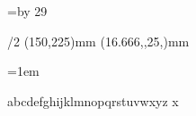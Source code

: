 

\fontfam[dante]



\currvar



\typosize[12/14.29]

\def\titlcap#1{%
	{\setff{+titl}\currvar #1}%
}


\svlang


\hsize=100mm
\vsize=\topskip \advance \vsize by 29\baselineskip

\margins/2 (150,225)mm (16.666,,25,)mm

\baselineskip


\def\myred{\setcmykcolor{0 1 1 0.25}}


\parskip=0pt
\parindent=1em

\def\startblockquote{%
	\par
	\vskip\baselineskip
	\advance\leftskip by 2\parindent
	\rightskip=\leftskip
	\_firstnoindent
	\it
}

\def\stopblockquote{%
	\par
	\vskip\baselineskip
	\rm
	\advance\leftskip by -2\parindent
	\rightskip=\leftskip
	\_firstnoindent
}


\def\person#1#2{%
	\null\vfill\break
	\ifodd\pageno
		\else \null \vfill\break
	\fi
	{\typosize[16/]\setff{+smcp,letterspace=10}\rm \smash{\centerline{#1}}}
	\vskip1\baselineskip
	\centerline{\it #2}
	\vskip4\baselineskip
	\_firstnoindent
}

\def\couple#1#2{%
	\vfill\break
	\ifodd\pageno
		\else \null \vfill\break
	\fi
	{\typosize[16/] 
	\smash{\centerline{\setff{+smcp, letterspace=10}\currvar #1}}%
	\vskip0.5\baselineskip
	\smash{\centerline{\it \&}}%
	\vskip0.5\baselineskip
	\smash{\centerline{\setff{+smcp, letterspace=10}\currvar #2}}}%
	\vskip4\baselineskip
	\_firstnoindent
	
}


\newbox\alphabetbox \setbox\alphabetbox\hbox{abcdefghijklmnopqrstuvwxyz}
\newbox\xheightbox \setbox\xheightbox\hbox{x}





